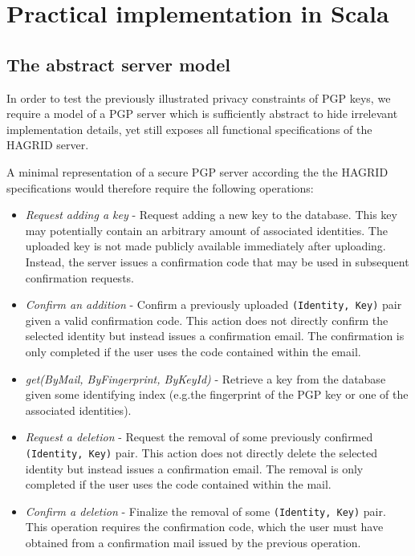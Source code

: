 
\section{Practical implementation in Scala}
\newpage
\subsection{The abstract server model}
In order to test the previously illustrated privacy constraints of PGP keys, we require a model of a PGP server which is sufficiently abstract to hide irrelevant implementation details, yet still exposes all functional specifications of the HAGRID server.

A minimal representation of a secure PGP server according the the HAGRID specifications would therefore require the following operations:
\begin{itemize}
    \item \emph{Request adding a key} - Request adding a new key to the database. This key may potentially contain an arbitrary amount of associated identities. The uploaded key is not made publicly available immediately after uploading. Instead, the server issues a confirmation code that may be used in subsequent confirmation requests.
    \item \emph{Confirm an addition} - Confirm a previously uploaded \texttt{(Identity, Key)} pair given a valid confirmation code. This action does not directly confirm the selected identity but instead issues a confirmation email. The confirmation is only completed if the user uses the code contained within the email.
    \item \emph{get(ByMail, ByFingerprint, ByKeyId)} - Retrieve a key from the database given some identifying index (e.g.the fingerprint of the PGP key or one of the associated identities).
    \item \emph{Request a deletion} - Request the removal of some previously confirmed \texttt{(Identity, Key)} pair. This action does not directly delete the selected identity but instead issues a confirmation email. The removal is only completed if the user uses the code contained within the mail.
    \item \emph{Confirm a deletion} - Finalize the removal of some \texttt{(Identity, Key)} pair. This operation requires the confirmation code, which the user must have obtained from a confirmation mail issued by the previous operation.
\end{itemize}


